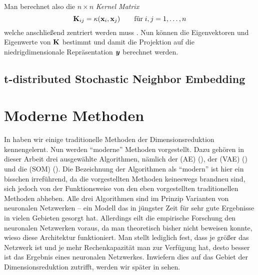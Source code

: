 Man berechnet also die $n \times n$ \textit{Kernel Matrix}
\begin{equation}
	\mathbf{K}_{ij} = \kappa(\mathbf{x}_i, \mathbf{x}_j) \qquad \text{für}\; i,j = 1,\ldots,n
\end{equation}
welche anschließend zentriert werden muss \parencite[598]{Bishop.2006}. Nun können die Eigenvektoren und Eigenwerte von $\mathbf{K}$ bestimmt und
damit die Projektion auf die niedrigdimensionale Repräsentation $\bm{y}$ berechnet
werden.

\subsection{t-distributed Stochastic Neighbor Embedding}
\label{ch:MethodenDerDimRed:traditionell:t-SNE}

\newpage

\section{Moderne Methoden}
\label{ch:MethodenDerDimRed:modern}
In  haben wir einige traditionelle Methoden der
Dimensionsreduktion kennengelernt. Nun werden \enquote{moderne} Methoden vorgestellt. Dazu gehören
in dieser Arbeit drei ausgewählte Algorithmen, nämlich der  (AE)
(), der  (VAE)
() und die  (SOM)
(). Die Bezeichnung der Algorithmen als \enquote{modern}
ist hier ein bisschen irreführend, da die vorgestellten Methoden keineswegs brandneu sind, sich
jedoch von der Funktionsweise von den eben vorgestellten traditionellen Methoden abheben. Alle drei
Algorithmen sind im Prinzip Varianten von neuronalen Netzwerken -- ein Modell das in jüngster Zeit
für sehr gute Ergebnisse in vielen Gebieten gesorgt hat. Allerdings eilt die empirische Forschung
den neuronalen Netzwerken voraus, da man theoretisch bisher nicht beweisen konnte, wieso diese
Architektur funktioniert. Man stellt lediglich fest, dass je größer das Netzwerk ist und je mehr
Rechenkapazität man zur Verfügung hat, desto besser ist das Ergebnis eines neuronalen
Netzwerkes\addref. Inwiefern dies auf das Gebiet der Dimensionsreduktion zutrifft, werden wir
später in  sehen.

